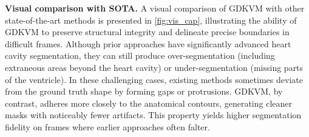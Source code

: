 
\noindent
\textbf{Visual comparison with SOTA.}
A visual comparison of GDKVM with other state-of-the-art methods is presented in \cref{fig:vis_cap}, illustrating the ability of GDKVM to preserve structural integrity and delineate precise boundaries in difficult frames. Although prior approaches have significantly advanced heart cavity segmentation, they can still produce over-segmentation (including extraneous areas beyond the heart cavity) or under-segmentation (missing parts of the ventricle). In these challenging cases, existing methods sometimes deviate from the ground truth shape by forming gaps or protrusions. GDKVM, by contrast, adheres more closely to the anatomical contours, generating cleaner masks with noticeably fewer artifacts. This property yields higher segmentation fidelity on frames where earlier approaches often falter.